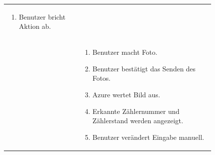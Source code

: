 \begin{figure}[H]
\begin{tabularx}{\textwidth}{ X | X }
\begin{enumerate}
			\item Benutzer bricht Aktion ab.
		\end{enumerate} \\ &
		\begin{enumerate}
			\item Benutzer macht Foto.
			\item Benutzer bestätigt das Senden des Fotos.
			\item Azure wertet Bild aus.
			\item Erkannte Zählernummer und Zählerstand werden angezeigt.
			\item Benutzer verändert Eingabe manuell.
		\end{enumerate} \\


	\end{tabularx}
\end{figure}

